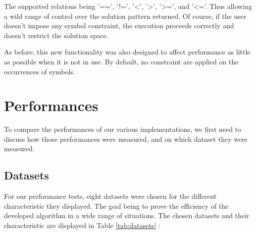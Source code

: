 \documentclass{eplmastersthesis}
\begin{document}
The supported relations being '==', '!=', '<', '>', '>=', and '<='. Thus allowing a wild range of control over the solution pattern returned. Of course, if the user doesn't impose any symbol constraint, the execution proceeds correctly and doesn't restrict the solution space. \newline

As before, this new functionality was also designed to affect performance as little as possible when it is not in use. By default, no constraint are applied on the occurrences of symbols.

\section{Performances}

To compare the performances of our various implementations, we first need to discuss how those performances were measured, and on which dataset they were measured.

\subsection{Datasets}

For our performance tests, eight datasets were chosen for the different characteristic they displayed. The goal being to prove the efficiency of the developed algorithm in a wide range of situations. The chosen datasets and their characteristic are displayed in Table \ref{tab:datasets} : \newline
\end{document}
